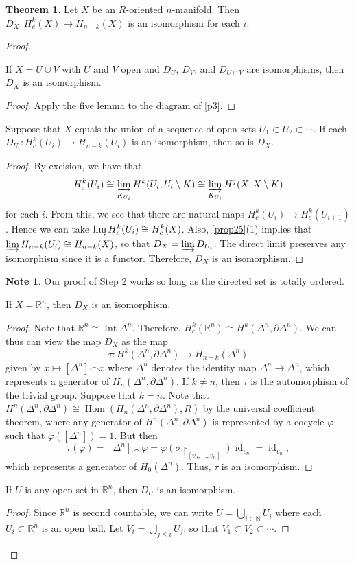 \documentclass[10pt,letterpaper,cm]{nupset}
\theoremstyle{definition}
\newtheorem{note}[definition]{Note}
\theoremstyle{theorem}
\newtheorem{theorem}[definition]{Theorem}
\theoremstyle{remark}
\newcommand{\N}{\mathbb N}
\newcommand{\R}{\mathbb{R}}
\newcommand{\1}{\mathbb{1}}
\newcommand{\0}{\vec 0}
\DeclareMathOperator{\id}{id}
\DeclareMathOperator{\Int}{Int}
\DeclareMathOperator{\Hom}{Hom}
\begin{document}
\begin{theorem}
Let $X$ be an $R$-oriented $n$-manifold.  Then $D_X : H_c^k(X) \to H_{n-k}(X)$ is an isomorphism for each $i$.
\end{theorem}
\begin{proof} $ $
\begin{steps}
\item If $X= U \cup V$ with $U$ and $V$ open and $D_U$, $D_V$, and $D_{U \cap V}$ are isomorphisms, then $D_X$ is an isomorphism.
\begin{proof}
Apply the five lemma to the diagram of \cref{p3}. 
\end{proof}
\item Suppose that $X$ equals the union of a sequence of open sets $U_1 \subset U_2 \subset \cdots$. If each $D_{U_i} : H^k_c(U_i) \to H_{n-k}(U_i)$ is an isomorphism, then so is $D_X$.
\begin{proof}
By excision, we have that $$H^k_c(U_i) \cong \varinjlim_{K_{U_i}}H^k(U_i, U_i \setminus K) \cong  \varinjlim_{K_{U_i}}H^j(X, X \setminus K) $$ for each $i$. From this, we see that there are natural maps $H^k_c(U_i) \to H^k_c(U_{i+1})$. Hence we can take $\varinjlim H^k_c(U_i) \cong H^k_c(X)$. Also, \cref{prop25}(1) implies that $\varinjlim H_{n-k}(U_i) \cong H_{n-k}(X)$, so that $D_X = \varinjlim D_{U_i}$. The direct limit  preserves any isomorphism  since it is a functor. Therefore, $D_X$ is an isomorphism.
\end{proof}
\begin{note}
Our proof of Step 2 works so long as the directed set is totally ordered.
\end{note}
\item If $X = \R^n$, then $D_X$ is an isomorphism. 
\begin{proof}
Note that $\R^n \cong \Int{\Delta^n}$. Therefore, $H^k_c(\R^n) \cong H^k(\Delta^n, \partial{\Delta^n})$. We can thus can view the map $D_X$ as the map $$\tau : H^k(\Delta^n, \partial{\Delta^n}) \to H_{n-k}(\Delta^n)$$ given by $x \mapsto [\Delta^n] \frown x$ where $\Delta^n$ denotes the identity map $\Delta^n \to \Delta^n$, which represents a generator of $H_n(\Delta^n, \partial{\Delta^n})$. If $k\ne n$, then $\tau$ is the automorphism of the trivial group. Suppose that $k=n$. Note that $H^n(\Delta^n, \partial{\Delta^n}) \cong \Hom(H_n(\Delta^n, \partial{\Delta^n}), R)$ by the universal coefficient theorem, where any generator of $H^n(\Delta^n, \partial{\Delta^n})$ is represented by a cocycle $\varphi$ such that $\varphi([\Delta^n])=1$. But then $$\tau(\varphi) = [\Delta^n] \frown \varphi = \varphi(\sigma \restriction_{[v_0, \ldots, v_n]})\id_{v_n} =\id_{v_n},$$ which represents a generator of $H_0(\Delta^n)$. Thus, $\tau$ is an isomorphism. 
\end{proof}
\item If $U$ is any open set in $\R^n$, then $D_U$ is an isomorphism.
\begin{proof}
Since $\R^n$ is second countable, we can write $U =\bigcup_{i\in \N} U_i$ where each $U_i \subset \R^n$ is an open ball. Let $V_i = \bigcup_{j \leq i} U_j$, so that $V_1 \subset V_2\subset \cdots$. 


\end{proof}
\end{steps}
\end{proof}
\end{document}

